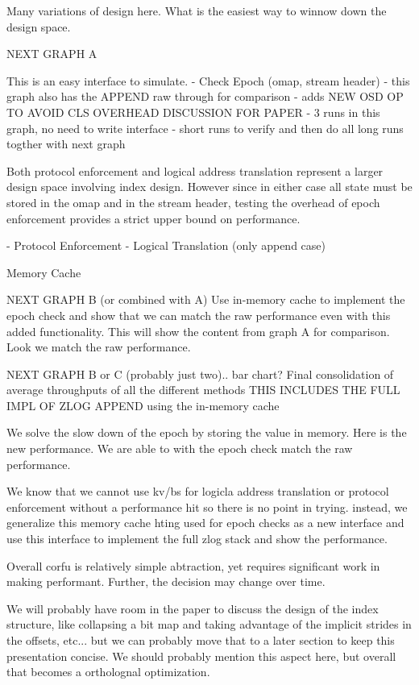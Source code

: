 \documentclass[10pt,twocolumn]{article}
\begin{document}
Many variations of design here. What is the easiest way to 
winnow down the design space.

NEXT GRAPH A

This is an easy interface to simulate.
- Check Epoch (omap, stream header)
- this graph also has the APPEND raw through for comparison
- adds NEW OSD OP TO AVOID CLS OVERHEAD DISCUSSION FOR PAPER
- 3 runs in this graph, no need to write interface
- short runs to verify and then do all long runs togther with next graph

Both protocol enforcement and logical address translation
represent a larger design space involving index design. However
since in either case all state must be stored in the omap and
in the stream header, testing the overhead of epoch enforcement
provides a strict upper bound on performance.

- Protocol Enforcement
- Logical Translation (only append case)

Memory Cache

NEXT GRAPH B (or combined with A)
Use in-memory cache to implement the epoch check and show that we can match
the raw performance even with this added functionality.
This will show the content from graph A for comparison. Look
we match the raw performance.

NEXT GRAPH B or C (probably just two).. bar chart?
 Final consolidation of average throughputs of all the different
methods
 THIS INCLUDES THE FULL IMPL OF ZLOG APPEND using the in-memory cache

We solve the slow down of the epoch by storing the value in memory. Here is
the new performance.  We are able to with the epoch check match the raw
performance.

We know that we cannot use kv/bs for logicla address translation or protocol
enforcement without a performance hit so there is no point in trying. instead,
we generalize this memory cache hting used for epoch checks as a
new interface and use this interface to implement the full zlog
stack and show the performance.

Overall corfu is relatively simple abtraction, yet requires significant
work in making performant. Further, the decision may change over time.

We will probably have room in the paper to discuss the design of the
index structure, like collapsing a bit map and taking advantage of
the implicit strides in the offsets, etc... but we can probably move
that to a later section to keep this presentation concise. We should
probably mention this aspect here, but overall that becomes a ortholognal
optimization.


\end{document}
